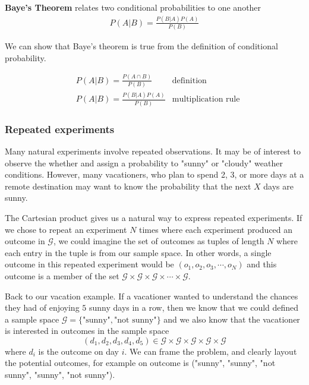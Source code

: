 \textbf{Baye's Theorem} relates two conditional probabilities to one another 
\begin{align}
    P(A | B) =  \frac{P(B | A) P(A)}{P(B)}
\end{align}

We can show that Baye's theorem is true from the definition of conditional probability. 

\begin{align}
    &P(A | B) = \frac{P(A \cap B)}{P(B)}  & \text{definition} \\ 
    &P(A | B) = \frac{P(B |A) P(A)}{P(B)} & \text{multiplication rule} 
\end{align}



\subsubsection{Repeated experiments}
Many natural experiments involve repeated observations. 
It may be of interest to observe the whether and assign a probability to "sunny" or "cloudy" weather conditions. 
However, many vacationers, who plan to spend 2, 3, or more days at a remote destination may want to know the probability that the next $X$ days are sunny. 

The Cartesian product gives us a natural way to express repeated experiments.
If we chose to repeat an experiment $N$ times where each experiment produced an outcome in $\mathcal{G}$, we could imagine the set of outcomes as tuples of length $N$ where each entry in the tuple is from our sample space.
In other words, a single outcome in this repeated experiment would be $(o_{1},o_{2},o_{3},\cdots,o_{N})$ and this outcome is a member of the set $\mathcal{G} \times \mathcal{G} \times \mathcal{G} \times \cdots \times \mathcal{G}$.

Back to our vacation example. 
If a vacationer wanted to understand the chances they had of enjoying $5$ sunny days in a row, then we know that we could defined a sample space $\mathcal{G} = \{\text{"sunny"},\text{"not sunny"}\}$ and we also know that the vacationer is interested in outcomes in the sample space 
\begin{equation}
    (d_{1},d_{2},d_{3},d_{4},d_{5}) \in \mathcal{G} \times \mathcal{G}\times \mathcal{G}\times \mathcal{G}\times \mathcal{G} 
\end{equation}
where $d_{i}$ is the outcome on day $i$.
We can frame the problem, and clearly layout the potential outcomes, for example on outcome is ("sunny", "sunny", "not sunny", "sunny", "not sunny").

